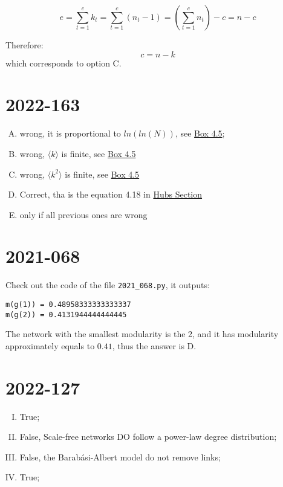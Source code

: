 \documentclass{article}
\begin{document}
$$
e
=
\displaystyle\sum\limits_{t=1}^{c} k_t
=
\displaystyle\sum\limits_{t=1}^{c} \left( n_t - 1 \right)
=
\left( \displaystyle\sum\limits_{t=1}^{c} n_t \right) - c
=
n - c
$$

Therefore:
$$ c = n - k $$
which corresponds to option C.

\section{2022-163}\label{2022-163}

\begin{enumerate}[A.]
    \item wrong, it is proportional to $ln(ln(N))$, see \href{http://networksciencebook.com/chapter/4#degree-exponent}{Box 4.5};
    \item wrong, $\langle k \rangle$ is finite, see \href{http://networksciencebook.com/chapter/4#degree-exponent}{Box 4.5}
    \item wrong, $\langle k^2 \rangle$ is finite, see \href{http://networksciencebook.com/chapter/4#degree-exponent}{Box 4.5}
    \item Correct, tha is the equation 4.18 in \href{http://networksciencebook.com/chapter/4#hubs}{Hubs Section}
    \item only if all previous ones are wrong
\end{enumerate}

\section{2021-068}\label{2021-068}

Check out the code of the file \verb|2021_068.py|, it outputs:

\begin{verbatim}
m(g(1)) = 0.48958333333333337
m(g(2)) = 0.4131944444444445
\end{verbatim}

The network with the smallest modularity is the 2, and it has modularity approximately equals to $0.41$, thus the answer is D.

\section{2022-127}\label{2022-127}

\begin{enumerate}[I.]
    \item True;
    \item False, Scale-free networks DO follow a power-law degree distribution;
    \item False, the Barabási-Albert model do not remove links;
    \item True;
\end{enumerate}
\end{document}

